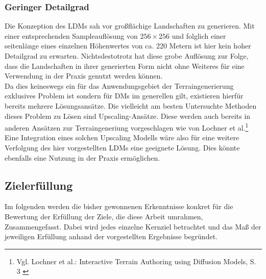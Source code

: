 \subsubsection{Geringer Detailgrad}

Die Konzeption des LDMs sah vor großflächige Landschaften zu generieren. Mit einer entsprechenden Sampleauflösung von $256\times256$ und folglich einer seitenlänge eines einzelnen Höhenwertes von ca. 220 Metern ist hier kein hoher Detailgrad zu erwarten. Nichtsdestotrotz hat diese grobe Auflösung zur Folge, dass die Landschaften in ihrer generierten Form nicht ohne Weiteres für eine Verwendung in der Praxis genutzt werden können. \\
Da dies keineswegs ein für das Anwendungsgebiet der Terraingenerierung exklusives Problem ist sondern für DMs im generellen gilt, existieren hierfür bereits mehrere Lösungsansätze. Die vielleicht am besten Untersuchte Methoden dieses Problem zu Lösen sind Upscaling-Ansätze. Diese werden auch bereits in anderen Ansätzen zur Terraingeneriung vorgeschlagen wie von Lochner et al.\footnote{
    Vgl. Lochner et al.: Interactive Terrain Authoring using Diffusion Models, S. 3
    \cite{lochner2023interactive}
} \\
Eine Integration eines solchen Upscaling Modells wäre also für eine weitere Verfolgung des hier vorgestellten LDMs eine geeignete Lösung. Dies könnte ebenfalls eine Nutzung in der Praxis ermöglichen.   

\subsection{Zielerfüllung}

Im folgenden werden die bisher gewonnenen Erkenntnisse konkret für die Bewertung der Erfüllung der Ziele, die diese Arbeit umrahmen, Zusammengefasst. Dabei wird jedes einzelne Kernziel betrachtet und das Maß der jeweiligen Erfüllung anhand der vorgestellten Ergebnisse begründet.

